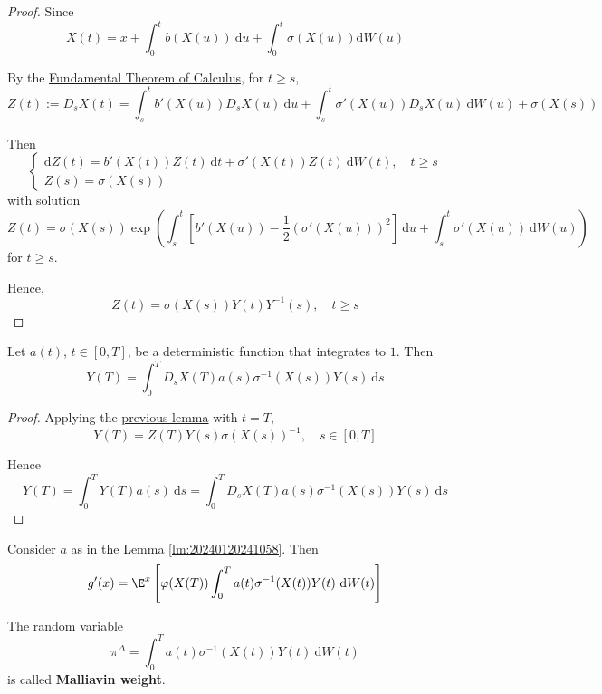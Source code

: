 \begin{proof}
Since
\[
X(t) = x + \int_0^t b(X(u)) ~\mathrm{d}u + \int_0^t \sigma(X(u)) \mathrm{d}W(u)
\]

By the \hyperref[thm:ftc]{Fundamental Theorem of Calculus}, for $t \ge s$,
\[
Z(t) := D_s X(t) = \int_s^t b'(X(u)) D_s X(u) ~\mathrm{d}u + \int_s^t \sigma'(X(u)) D_s X(u) ~\mathrm{d}W(u) + \sigma(X(s))
\]

Then 
\begin{equation*}
\begin{cases}
\mathrm{d}Z(t) = b'(X(t)) Z(t) ~\mathrm{d}t + \sigma'(X(t)) Z(t)~\mathrm{d}W(t), \quad t \ge s \\
Z(s) = \sigma(X(s))
\end{cases}
\end{equation*}
with solution 
\[
Z(t) = \sigma(X(s))\exp \left( \int_s^t \left[ b'(X(u)) - \dfrac{1}{2}(\sigma'(X(u)))^2 \right] ~\mathrm{d}u + \int_s^t \sigma'(X(u)) ~\mathrm{d}W(u) \right)
\]
for $t \ge s$.

Hence,
\[
Z(t) = \sigma(X(s))Y(t)Y^{-1}(s), \quad t \ge s
\]

\end{proof}

\begin{lemma}\label{lm:20240120241058}
Let $a(t)$, $t \in [0,T]$, be a deterministic function that integrates to $1$. Then
\begin{equation}
Y(T) = \int_0^T D_s X(T) a(s) \sigma^{-1}(X(s)) Y(s) ~\mathrm{d}s
\end{equation}
\end{lemma}

\begin{proof}
	Applying the \hyperref[lm:202401241049]{previous lemma} with $t = T$,
\[
Y(T) = Z(T)Y(s) \sigma(X(s))^{-1}, \quad s \in [0,T]
\]

Hence
\[
Y(T) = \int_0^T Y(T) a(s) ~\mathrm{d}s = \int_0^T D_s X(T) a(s) \sigma^{-1}(X(s)) Y(s) ~\mathrm{d}s
\]
\end{proof}

\begin{theorem}
Consider $a$ as in the Lemma \ref{lm:20240120241058}. Then 
\begin{equation}
g'(x) = \E^x \left[ \varphi(X(T)) \int_0^T a(t) \sigma^{-1}(X(t))Y(t) ~\mathrm{d}W(t) \right]
\end{equation}

The random variable 
\[
	\pi^\Delta = \int_0^T a(t) \sigma^{-1}(X(t)) Y(t) ~\mathrm{d}W(t)
\]
is called \textbf{Malliavin weight}.
\end{theorem}

